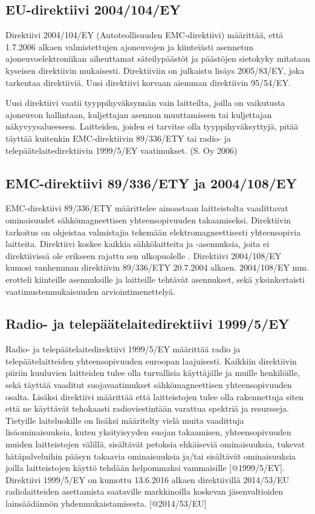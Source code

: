 \documentclass[11pt,a4paper,oneside,article]{memoir}
\begin{document}
\subsection{EU-direktiivi 2004/104/EY}

Direktiivi 2004/104/EY (Autoteollisuuden EMC-direktiivi) määrittää, että
1.7.2006 alkaen valmistettujen ajoneuvojen ja kiinteiästi asennetun
ajoneuvoelektroniikan aiheuttamat säteilypäästöt ja päästöjen sietokyky
mitataan kyseisen direktiivin mukaisesti. Direktiiviin on julkaistu
lisäys 2005/83/EY, joka tarkentaa direktiiviä. Uusi direktiivi korvaan
aiemman direktiivin 95/54/EY.

Uusi direktiivi vaatii tyyppihyväksynnän vain laitteilta, joilla on
vaikutusta ajoneuvon hallintaan, kuljettajan asennon muuttamiseen tai
kuljettajan näkyvyysalueeseen. Laitteiden, joiden ei tarvitse olla
tyyppihyväksyttyjä, pitää täyttää kuitenkin EMC-direktiivin 89/336/ETY
tai radio- ja telepäätelaitedirektiivin 1999/5/EY vaatimukset. (S. Oy
2006) \cite{1999/5/EY} \cite{89/336/ETY}

\subsection{EMC-direktiivi 89/336/ETY ja
2004/108/EY}

EMC-direktiivi 89/336/ETY määrittelee ainoastaan laitteistolta
vaadittavat ominaisuudet sähkömagneettisen yhteensopivuuden
takaamiseksi. Direktiivin tarkoitus on ohjeistaa valmistajia tekemään
elektromagneettisesti yhteensopivia laitteita. Direktiivi koskee kaikkia
sähkölaitteita ja -asennuksia, joita ei direktiivissä ole erikseen
rajattu sen ulkopuolelle \cite{89/336/ETY}. Direktiivi 2004/108/EY
kumosi vanhemman direktiivin 89/336/ETY 20.7.2004 alkaen. 2004/108/EY
mm. erotteli kiinteille asennuksille ja laitteille tehtävät asennukset,
sekä yksinkertaisti vaatimustenmukaisuuden arviointimenettelyä.
\cite{2004/108/EY}

\subsection{Radio- ja telepäätelaitedirektiivi
1999/5/EY}

Radio- ja telepäätelaitedirektiivi 1999/5/EY määrittää radio ja
telepäätelaitteiden yhteensopivuuden euroopan laajuisesti. Kaikkiin
direktiivin piiriin kuuluvien laitteiden tulee olla turvallisia
käyttäjälle ja muille henkilöille, sekä täyttää vaaditut
suojavaatimukset sähkömagneettisen yhteensopivuuden osalta. Lisäksi
direktiivi määrittää että laitteistojen tulee olla rakennettuja siten
että ne käyttävät tehokaasti radioviestintään varattua spektriä ja
resursseja. Tietyille laiteluokille on lisäksi määritelty vielä muita
vaadittuja lisäominaisuuksia, kuten yksityisyyden suojan takaamisen,
yhteensopivuuden muiden laitteistojen välillä, sisältävät petoksia
ehkäiseviä ominaisuuksia, tukevat hätäpalveluihin pääsyn takaavia
ominaisuuksia ja/tai sisältävät ominaisuuksia joilla laitteistojen
käyttö tehdään helpommaksi vammaisille {[}@1999/5/EY{]}. Direktiivi
1999/5/EY on kumottu 13.6.2016 alkaen direktiivillä 2014/53/EU
radiolaitteiden asettamista saataville markkinoilla koskevan
jäsenvaltioiden lainsäädännön yhdenmukaistamisesta. {[}@2014/53/EU{]}
\end{document}
